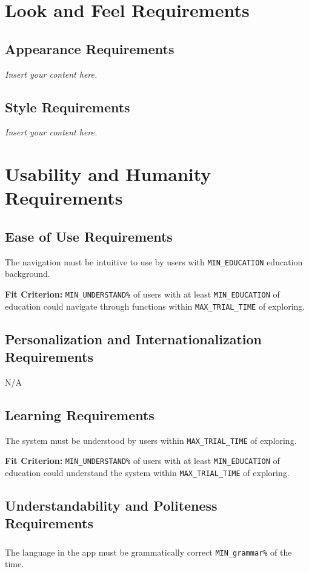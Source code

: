 \documentclass[12pt]{article}
\newcommand{\lips}{\textit{Insert your content here.}}
\begin{document}
\section{Look and Feel Requirements}
\subsection{Appearance Requirements}
\lips
\subsection{Style Requirements}
\lips

\section{Usability and Humanity Requirements}
\subsection{Ease of Use Requirements}
The navigation must be intuitive to use by users with \texttt{MIN\_EDUCATION} education background.

\textbf{Fit Criterion:} \texttt{MIN\_UNDERSTAND\%} of users with at least \texttt{MIN\_EDUCATION} of education could navigate through functions within \texttt{MAX\_TRIAL\_TIME} of exploring.

\subsection{Personalization and Internationalization Requirements}
N/A
\subsection{Learning Requirements}
The system must be understood by users within \texttt{MAX\_TRIAL\_TIME} of exploring.

\textbf{Fit Criterion:} \texttt{MIN\_UNDERSTAND\%} of users with at least \texttt{MIN\_EDUCATION} of education could understand the system within \texttt{MAX\_TRIAL\_TIME} of exploring.
\subsection{Understandability and Politeness Requirements}
\subsubsection{}
The language in the app must be grammatically correct \texttt{MIN\_grammar\%} of the time.
\end{document}
